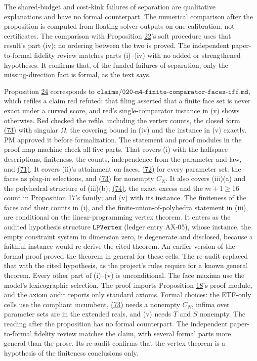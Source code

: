 \documentclass[11pt]{article}
\begin{document}
The shared-budget and cost-kink failures of separation are
qualitative explanations and have no formal counterpart. The
numerical comparison after the proposition is computed from floating
solver outputs on one calibration, not certificates. The comparison
with Proposition \hyperref[res:Proposition-22]{22}'s soft procedure uses that result's part (iv);
no ordering between the two is proved. The independent paper-to-formal
fidelity review matches parts (i)--(iv) with no added or
strengthened hypotheses. It confirms that, of the funded failures of
separation, only the missing-direction fact is formal, as the text
says.

Proposition \hyperref[res:Proposition-24]{24} corresponds to
\(\texttt{claims/020-m4-finite-comparator-faces-iff.md}\), which
refiles a claim red refuted: that filing asserted that a finite face
set is never exact under a curved score, and red's single-comparator
instance in (v) shows otherwise. Red checked the refile, including
the vertex counts, the closed form \hyperref[eq:73]{(73)} with singular \(\Omega\),
the covering bound in (iv) and the instance in (v) exactly. PM
approved it before formalization. The statement and proof modules
in the proof map machine check all five parts. That covers (i)
with the halfspace descriptions, finiteness, the counts,
independence from the parameter and law, and \hyperref[eq:71]{(71)}. It covers
(ii)'s attainment on faces, \hyperref[eq:72]{(72)} for every parameter set, the
faces as plug-in selections, and \hyperref[eq:73]{(73)} for nonempty \(C_N\). It also
covers (iii)(a) and the polyhedral structure of (iii)(b); \hyperref[eq:74]{(74)},
the exact excess and the \(m+1\geq16\) count in Proposition \hyperref[res:Proposition-17]{17}'s
family; and (v) with its instance. The finiteness of the faces
and their counts in (i), and the finite-union-of-polyhedra
statement in (iii), are conditional on the linear-programming vertex
theorem. It enters as the audited hypothesis structure
\(\texttt{LPVertex}\) (ledger entry AX-05), whose instance, the
empty constraint system in dimension zero, is degenerate and
disclosed, because a faithful instance would re-derive the cited
theorem. An earlier version of the formal proof proved the theorem
in general for these cells. The re-audit replaced that with the
cited hypothesis, as the project's rules require for a known general
theorem. Every other part of (i)--(v) is unconditional. The face
maxima use the model's lexicographic selection. The proof imports
Proposition \hyperref[res:Proposition-18]{18}'s proof module, and the axiom audit reports only
standard axioms.
Formal choices: the ETF-only cells use the compliant incumbent,
\hyperref[eq:73]{(73)} needs a nonempty \(C_N\), infima over parameter sets are in the
extended reals, and (v) needs \(T\) and \(S\) nonempty. The reading
after the proposition has no formal counterpart. The independent
paper-to-formal fidelity review matches the claim, with several
formal parts more general than the prose. Its re-audit confirms that
the vertex theorem is a hypothesis of the finiteness conclusions
only.
\end{document}
